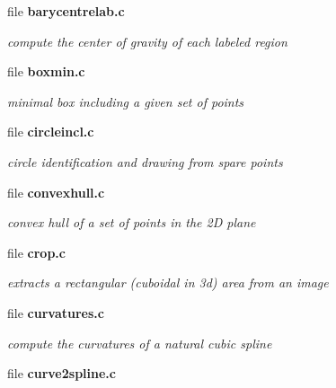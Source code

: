 \begin{DoxyCompactItemize}
\item 
file {\bf barycentrelab.c}


\begin{DoxyCompactList}\small\item\em compute the center of gravity of each labeled region \item\end{DoxyCompactList}

\item 
file {\bf boxmin.c}


\begin{DoxyCompactList}\small\item\em minimal box including a given set of points \item\end{DoxyCompactList}

\item 
file {\bf circleincl.c}


\begin{DoxyCompactList}\small\item\em circle identification and drawing from spare points \item\end{DoxyCompactList}

\item 
file {\bf convexhull.c}


\begin{DoxyCompactList}\small\item\em convex hull of a set of points in the 2D plane \item\end{DoxyCompactList}

\item 
file {\bf crop.c}


\begin{DoxyCompactList}\small\item\em extracts a rectangular (cuboidal in 3d) area from an image \item\end{DoxyCompactList}

\item 
file {\bf curvatures.c}


\begin{DoxyCompactList}\small\item\em compute the curvatures of a natural cubic spline \item\end{DoxyCompactList}

\item 
file {\bf curve2spline.c}



\end{DoxyCompactItemize}
